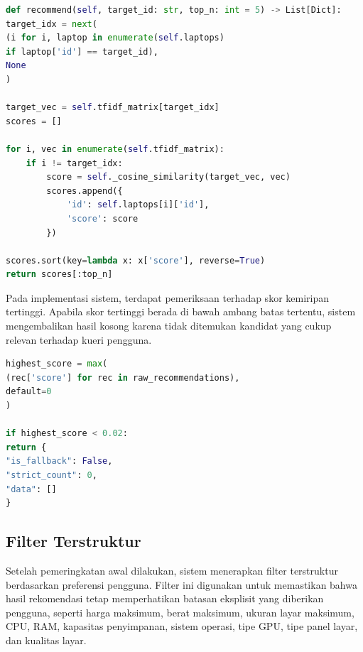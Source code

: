 \begin{lstlisting}[basicstyle=\linespread{0.8}\ttfamily\footnotesize, language=Python, breaklines=true, caption={Potongan Kode Pemeringkatan Awal Berdasarkan Skor}, label=kode:pemeringkatan_awal]
def recommend(self, target_id: str, top_n: int = 5) -> List[Dict]:
target_idx = next(
(i for i, laptop in enumerate(self.laptops)
if laptop['id'] == target_id),
None
)

target_vec = self.tfidf_matrix[target_idx]
scores = []

for i, vec in enumerate(self.tfidf_matrix):
    if i != target_idx:
        score = self._cosine_similarity(target_vec, vec)
        scores.append({
            'id': self.laptops[i]['id'],
            'score': score
        })
        
scores.sort(key=lambda x: x['score'], reverse=True)
return scores[:top_n]
\end{lstlisting}

Pada implementasi sistem, terdapat pemeriksaan terhadap skor kemiripan tertinggi. Apabila skor tertinggi berada di bawah ambang batas tertentu, sistem mengembalikan hasil kosong karena tidak ditemukan kandidat yang cukup relevan terhadap kueri pengguna.

\begin{lstlisting}[basicstyle=\linespread{0.8}\ttfamily\footnotesize, language=Python, breaklines=true, caption={Potongan Kode Pemeriksaan Ambang Batas Skor}, label=kode:threshold_similarity]
highest_score = max(
(rec['score'] for rec in raw_recommendations),
default=0
)

if highest_score < 0.02:
return {
"is_fallback": False,
"strict_count": 0,
"data": []
}
\end{lstlisting}

\subsection{Filter Terstruktur}
Setelah pemeringkatan awal dilakukan, sistem menerapkan filter terstruktur berdasarkan preferensi pengguna. Filter ini digunakan untuk memastikan bahwa hasil rekomendasi tetap memperhatikan batasan eksplisit yang diberikan pengguna, seperti harga maksimum, berat maksimum, ukuran layar maksimum, CPU, RAM, kapasitas penyimpanan, sistem operasi, tipe GPU, tipe panel layar, dan kualitas layar.

